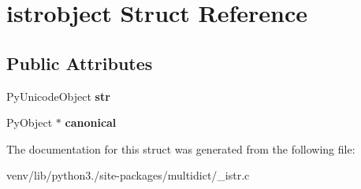 \hypertarget{structistrobject}{}\section{istrobject Struct Reference}
\label{structistrobject}
\subsection*{Public Attributes}
\begin{DoxyCompactItemize}
\item 
\mbox{\label{structistrobject_aef6f261e9345964bbdd29931a9cc8839}} 
Py\+Unicode\+Object {\bfseries str}
\item 
\mbox{\label{structistrobject_a353b8c04fb6ceb0110079630ff581ff0}} 
Py\+Object $\ast$ {\bfseries canonical}
\end{DoxyCompactItemize}


The documentation for this struct was generated from the following file\+:\begin{DoxyCompactItemize}
\item 
venv/lib/python3./site-\/packages/multidict/\+\_\+istr.\+c\end{DoxyCompactItemize}

